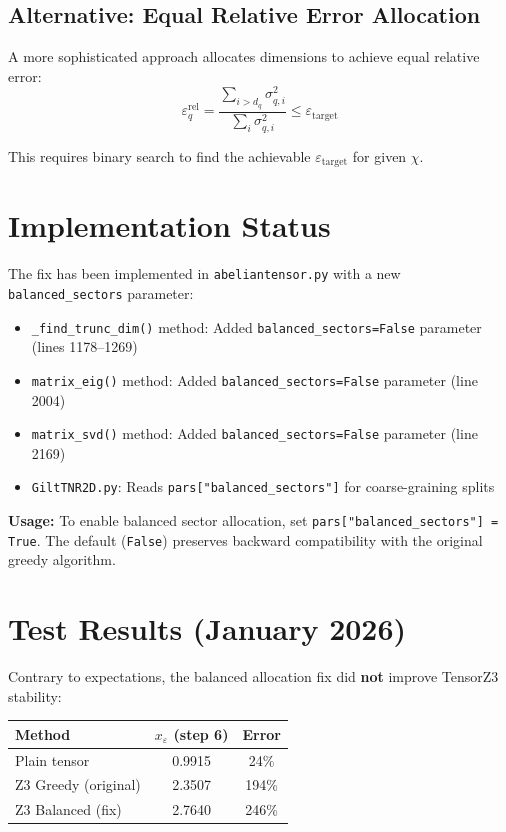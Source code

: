 \documentclass{article}
\begin{document}
\subsection{Alternative: Equal Relative Error Allocation}

A more sophisticated approach allocates dimensions to achieve equal relative error:
\begin{equation}
    \varepsilon_q^{\text{rel}} = \frac{\sum_{i > d_q} \sigma_{q,i}^2}{\sum_i \sigma_{q,i}^2} \leq \varepsilon_{\text{target}}
\end{equation}

This requires binary search to find the achievable $\varepsilon_{\text{target}}$ for given $\chi$.

\section{Implementation Status}

The fix has been implemented in \texttt{abeliantensor.py} with a new \texttt{balanced\_sectors} parameter:

\begin{itemize}
    \item \texttt{\_find\_trunc\_dim()} method: Added \texttt{balanced\_sectors=False} parameter (lines 1178--1269)
    \item \texttt{matrix\_eig()} method: Added \texttt{balanced\_sectors=False} parameter (line 2004)
    \item \texttt{matrix\_svd()} method: Added \texttt{balanced\_sectors=False} parameter (line 2169)
    \item \texttt{GiltTNR2D.py}: Reads \texttt{pars["balanced\_sectors"]} for coarse-graining splits
\end{itemize}

\textbf{Usage:} To enable balanced sector allocation, set \texttt{pars["balanced\_sectors"] = True}. The default (\texttt{False}) preserves backward compatibility with the original greedy algorithm.

\section{Test Results (January 2026)}

Contrary to expectations, the balanced allocation fix did \textbf{not} improve TensorZ3 stability:

\begin{center}
\begin{tabular}{|l|c|c|}
\hline
\textbf{Method} & \textbf{$x_\varepsilon$ (step 6)} & \textbf{Error} \\
\hline
Plain tensor & 0.9915 & 24\% \\
Z3 Greedy (original) & 2.3507 & 194\% \\
Z3 Balanced (fix) & 2.7640 & 246\% \\
\hline
\end{tabular}
\end{center}
\end{document}
